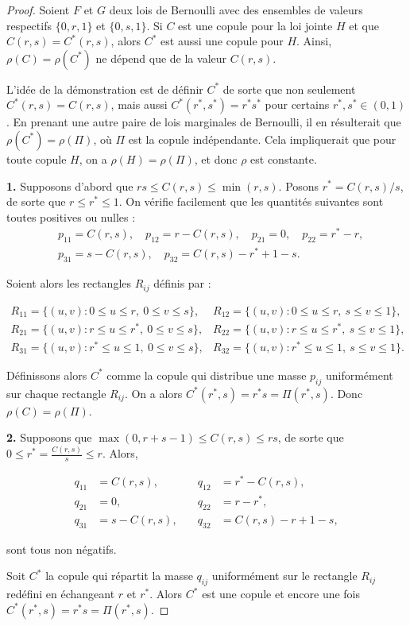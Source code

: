 \documentclass[a4paper,11pt]{amsbook}
\numberwithin{equation}{chapter}
\theoremstyle{definition}
\begin{document}
\begin{proof}
Soient $F$ et $G$ deux lois de Bernoulli avec des ensembles de valeurs respectifs $\{0, r, 1\}$ et $\{0, s, 1\}$. Si $C$ est une copule pour la loi jointe $H$ et que $C(r,s) = C^*(r,s)$, alors $C^*$ est aussi une copule pour $H$. Ainsi, $\rho(C) = \rho(C^*)$ ne dépend que de la valeur $C(r,s)$. 

L'idée de la démonstration est de définir $C^*$ de sorte que non seulement $C^*(r,s) = C(r,s)$, mais aussi $C^*(r^*, s^*) = r^* s^*$ pour certains $r^*, s^* \in (0,1)$. En prenant une autre paire de lois marginales de Bernoulli, il en résulterait que $\rho(C^*) = \rho(\Pi)$, où $\Pi$ est la copule indépendante. Cela impliquerait que pour toute copule $H$, on a $\rho(H) = \rho(\Pi)$, et donc $\rho$ est constante.

\textbf{1.} Supposons d'abord que $rs \leq C(r,s) \leq \min(r,s)$. Posons $r^* = C(r,s)/s$, de sorte que $r \leq r^* \leq 1$. On vérifie facilement que les quantités suivantes sont toutes positives ou nulles :
\[
\begin{aligned}
& p_{11} = C(r,s), \quad p_{12} = r - C(r,s), \quad p_{21} = 0, \quad p_{22} = r^* - r, \\
& p_{31} = s - C(r,s), \quad p_{32} = C(r,s) - r^* + 1 - s.
\end{aligned}
\]

Soient alors les rectangles $R_{ij}$ définis par :

\[
\begin{array}{ll}
R_{11} = \{(u,v) : 0 \leq u \leq r,\ 0 \leq v \leq s\}, & 
R_{12} = \{(u,v) : 0 \leq u \leq r,\ s \leq v \leq 1\}, \\
R_{21} = \{(u,v) : r \leq u \leq r^*,\ 0 \leq v \leq s\}, & 
R_{22} = \{(u,v) : r \leq u \leq r^*,\ s \leq v \leq 1\}, \\
R_{31} = \{(u,v) : r^* \leq u \leq 1,\ 0 \leq v \leq s\}, & 
R_{32} = \{(u,v) : r^* \leq u \leq 1,\ s \leq v \leq 1\}.
\end{array}
\]

Définissons alors $C^*$ comme la copule qui distribue une masse $p_{ij}$ uniformément sur chaque rectangle $R_{ij}$. On a alors $C^*(r^*, s) = r^* s = \Pi(r^*, s)$. Donc $\rho(C) = \rho(\Pi)$.

\textbf{2.} Supposons que $\max(0, r + s - 1) \leq C(r,s) \leq rs$, de sorte que $0 \leq r^* = \frac{C(r,s)}{s} \leq r$. Alors,

\[
\begin{array}{rlrl}
q_{11} &= C(r,s),       &\quad q_{12} &= r^* - C(r,s), \\
q_{21} &= 0,            &\quad q_{22} &= r - r^*,      \\
q_{31} &= s - C(r,s),   &\quad q_{32} &= C(r,s) - r + 1 - s,
\end{array}
\]


sont tous non négatifs.

Soit $C^*$ la copule qui répartit la masse $q_{ij}$ uniformément sur le rectangle $R_{ij}$ redéfini en échangeant $r$ et $r^*$. Alors $C^*$ est une copule et encore une fois $C^*(r^*, s) = r^*s = \Pi(r^*, s)$.


\end{proof}
\end{document}
